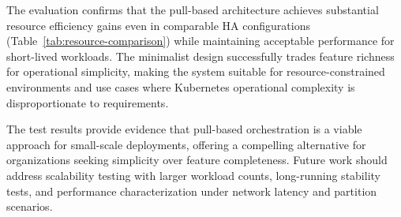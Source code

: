 The evaluation confirms that the pull-based architecture achieves substantial resource efficiency gains even in comparable HA configurations (Table~\ref{tab:resource-comparison}) while maintaining acceptable performance for short-lived workloads. The minimalist design successfully trades feature richness for operational simplicity, making the system suitable for resource-constrained environments and use cases where Kubernetes operational complexity is disproportionate to requirements.

The test results provide evidence that pull-based orchestration is a viable approach for small-scale deployments, offering a compelling alternative for organizations seeking simplicity over feature completeness. Future work should address scalability testing with larger workload counts, long-running stability tests, and performance characterization under network latency and partition scenarios.
